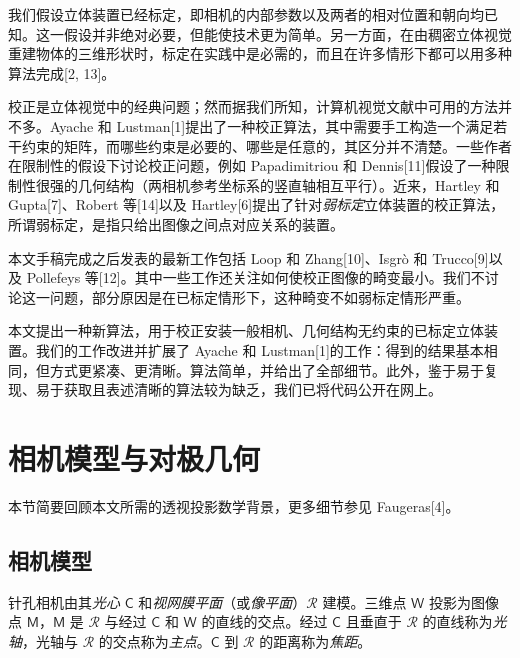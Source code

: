 \documentclass[a4paper,twocolumn,zihao=5,fontset=none,UTF8]{ctexart}
\newcommand{\pt}[1]{\mathsf{#1}}
\begin{document}
我们假设立体装置已经标定，即相机的内部参数以及两者的相对位置和朝向均已知。这一假设并非绝对必要，但能使技术更为简单。另一方面，在由稠密立体视觉重建物体的三维形状时，标定在实践中是必需的，而且在许多情形下都可以用多种算法完成[2, 13]。

校正是立体视觉中的经典问题；然而据我们所知，计算机视觉文献中可用的方法并不多。Ayache 和 Lustman[1]提出了一种校正算法，其中需要手工构造一个满足若干约束的矩阵，而哪些约束是必要的、哪些是任意的，其区分并不清楚。一些作者在限制性的假设下讨论校正问题，例如 Papadimitriou 和 Dennis[11]假设了一种限制性很强的几何结构（两相机参考坐标系的竖直轴相互平行）。近来，Hartley 和 Gupta[7]、Robert 等[14]以及 Hartley[6]提出了针对\emph{弱标定}立体装置的校正算法，所谓弱标定，是指只给出图像之间点对应关系的装置。

本文手稿完成之后发表的最新工作包括 Loop 和 Zhang[10]、Isgr\`o 和 Trucco[9]以及 Pollefeys 等[12]。其中一些工作还关注如何使校正图像的畸变最小。我们不讨论这一问题，部分原因是在已标定情形下，这种畸变不如弱标定情形严重。

本文提出一种新算法，用于校正安装一般相机、几何结构无约束的已标定立体装置。我们的工作改进并扩展了 Ayache 和 Lustman[1]的工作：得到的结果基本相同，但方式更紧凑、更清晰。算法简单，并给出了全部细节。此外，鉴于易于复现、易于获取且表述清晰的算法较为缺乏，我们已将代码公开在网上。

\section{相机模型与对极几何}

本节简要回顾本文所需的透视投影数学背景，更多细节参见 Faugeras[4]。

\subsection{相机模型}

针孔相机由其\emph{光心} $\pt{C}$ 和\emph{视网膜平面}（或\emph{像平面}）$\mathcal{R}$ 建模。三维点 $\pt{W}$ 投影为图像点 $\pt{M}$，$\pt{M}$ 是 $\mathcal{R}$ 与经过 $\pt{C}$ 和 $\pt{W}$ 的直线的交点。经过 $\pt{C}$ 且垂直于 $\mathcal{R}$ 的直线称为\emph{光轴}，光轴与 $\mathcal{R}$ 的交点称为\emph{主点}。$\pt{C}$ 到 $\mathcal{R}$ 的距离称为\emph{焦距}。
\end{document}
